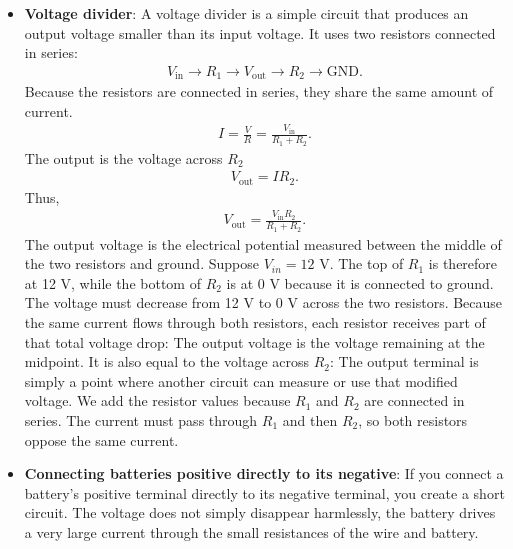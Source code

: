 \documentclass{report}
\begin{document}
\begin{itemize}
            \bigbreak \noindent 
        \item \textbf{Voltage divider}: A voltage divider is a simple circuit that produces an output voltage smaller than its input voltage. It uses two resistors connected in series:
            \begin{align*}
                V_{\text{in}} \to R_{1} \to V_{\text{out}} \to R_{2} \to \text{GND}
            .\end{align*}
            \bigbreak \noindent 
            \bigbreak \noindent 
            Because the resistors are connected in series, they share the same amount of current.
            \begin{align*}
                I = \frac{V}{R} = \frac{V_{\text{in}}}{R_{1} + R_{2}}
            .\end{align*}
            The output is the voltage across $R_{2}$
            \begin{align*}
                V_{\text{out}} = IR_{2}
            .\end{align*}
            Thus,
            \begin{align*}
                V_{\text{out}} = \frac{V_{\text{in}}R_{2}}{R_{1} + R_{2}}
            .\end{align*}
            The output voltage is the electrical potential measured between the middle of the two resistors and ground.
            \bigbreak \noindent 
            Suppose \(V_{in}=12\text{ V}\). The top of \(R_1\) is therefore at 12 V, while the bottom of \(R_2\) is at 0 V because it is connected to ground. The voltage must decrease from 12 V to 0 V across the two resistors.
            \bigbreak \noindent 
            Because the same current flows through both resistors, each resistor receives part of that total voltage drop:
            \bigbreak \noindent 
            The output voltage is the voltage remaining at the midpoint. It is also equal to the voltage across \(R_2\):
            \bigbreak \noindent 
            The output terminal is simply a point where another circuit can measure or use that modified voltage.
            \bigbreak \noindent 
            We add the resistor values because \(R_1\) and \(R_2\) are connected in series. The current must pass through \(R_1\) and then \(R_2\), so both resistors oppose the same current.
        \item \textbf{Connecting batteries positive directly to its negative}: If you connect a battery’s positive terminal directly to its negative terminal, you create a short circuit. The voltage does not simply disappear harmlessly, the battery drives a very large current through the small resistances of the wire and battery.

\end{itemize}
\end{document}
